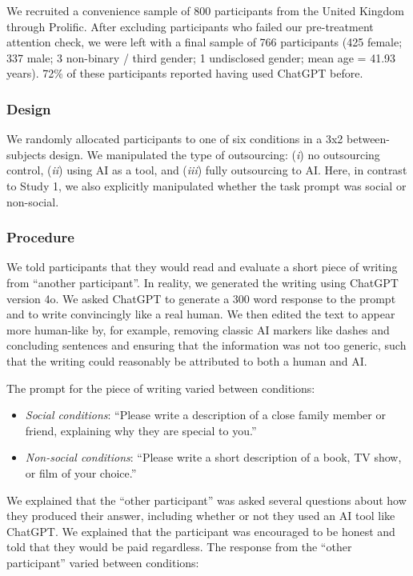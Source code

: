 \documentclass[
  man,
  floatsintext,
  longtable,
  nolmodern,
  notxfonts,
  notimes,
  colorlinks=true,linkcolor=blue,citecolor=blue,urlcolor=blue]{apa7}
\providecommand{\tightlist}{%
  \setlength{\itemsep}{0pt}\setlength{\parskip}{0pt}}
\begin{document}
We recruited a convenience sample of 800 participants from the United
Kingdom through Prolific. After excluding participants who failed our
pre-treatment attention check, we were left with a final sample of 766
participants (425 female; 337 male; 3 non-binary / third gender; 1
undisclosed gender; mean age = 41.93 years). 72\% of these participants
reported having used ChatGPT before.

\subsubsection*{Design}\label{design-1}

We randomly allocated participants to one of six conditions in a 3x2
between-subjects design. We manipulated the type of outsourcing:
(\emph{i}) no outsourcing control, (\emph{ii}) using AI as a tool, and
(\emph{iii}) fully outsourcing to AI. Here, in contrast to Study 1, we
also explicitly manipulated whether the task prompt was social or
non-social.

\subsubsection*{Procedure}\label{procedure-1}

We told participants that they would read and evaluate a short piece of
writing from ``another participant''. In reality, we generated the
writing using ChatGPT version 4o. We asked ChatGPT to generate a 300
word response to the prompt and to write convincingly like a real human.
We then edited the text to appear more human-like by, for example,
removing classic AI markers like dashes and concluding sentences and
ensuring that the information was not too generic, such that the writing
could reasonably be attributed to both a human and AI.

The prompt for the piece of writing varied between conditions:

\begin{itemize}
\tightlist
\item
  \emph{Social conditions}: ``Please write a description of a close
  family member or friend, explaining why they are special to you.''
\item
  \emph{Non-social conditions}: ``Please write a short description of a
  book, TV show, or film of your choice.''
\end{itemize}

We explained that the ``other participant'' was asked several questions
about how they produced their answer, including whether or not they used
an AI tool like ChatGPT. We explained that the participant was
encouraged to be honest and told that they would be paid regardless. The
response from the ``other participant'' varied between conditions:
\end{document}
